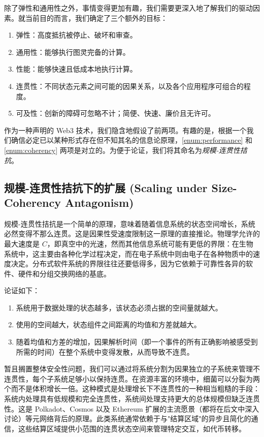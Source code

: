 除了弹性和通用性之外，事情变得更加有趣，我们需要更深入地了解我们的驱动因素。就当前目的而言，我们确定了三个额外的目标：
\begin{enumerate}
  \item \label{enum:resilience} 弹性：高度抵抗被停止、破坏和审查。
  \item \label{enum:generality} 通用性：能够执行图灵完备的计算。
  \item \label{enum:performance} 性能：能够快速且低成本地执行计算。
  \item \label{enum:coherency} 连贯性：不同状态元素之间可能的因果关系，以及各个应用程序可组合的程度。
  \item \label{enum:accessibility} 可及性：创新的障碍可忽略不计；简便、快速、廉价且无许可。
\end{enumerate}

作为一种声明的 Web3 技术，我们隐含地假设了前两项。有趣的是，根据一个我们确信必定已以某种形式存在但不知其名的信息论原理，\ref{enum:performance} 和 \ref{enum:coherency} 两项是对立的。为便于论证，我们将其命名为\emph{规模-连贯性拮抗}。

\subsection{规模-连贯性拮抗下的扩展 (Scaling under Size-Coherency Antagonism)}

规模-连贯性拮抗是一个简单的原理，意味着随着信息系统的状态空间增长，系统必然变得不那么连贯。这是因果性受速度限制这一原理的直接推论。物理学允许的最大速度是 $C$，即真空中的光速，然而其他信息系统可能有更低的界限：在生物系统中，这主要由各种化学过程决定，而在电子系统中则由电子在各种物质中的速度决定。分布式软件系统的界限往往还要低得多，因为它依赖于可靠性各异的软件、硬件和分组交换网络的基底。

论证如下：
\begin{enumerate}
  \item 系统用于数据处理的状态越多，该状态必须占据的空间量就越大。
  \item 使用的空间越大，状态组件之间距离的均值和方差就越大。
  \item 随着均值和方差的增加，因果解析时间（即一个事件的所有正确影响被感受到所需的时间）在整个系统中变得发散，从而导致不连贯。
\end{enumerate}

暂且搁置整体安全性问题，我们可以通过将系统分割为因果独立的子系统来管理不连贯性，每个子系统足够小以保持连贯。在资源丰富的环境中，细菌可以分裂为两个而不是体积增长一倍。这种模式是处理增长下不连贯性的一种相当粗糙的手段：系统内处理具有低规模和完全连贯性，系统间处理支持更大的总体规模但缺乏连贯性。这是 Polkadot、Cosmos 以及 Ethereum 扩展的主流愿景（都将在后文中深入讨论）等元网络背后的原理。此类系统通常依赖于与"结算区域"的异步且简化的通信，这些结算区域提供小范围的连贯状态空间来管理特定交互，如代币转移。

